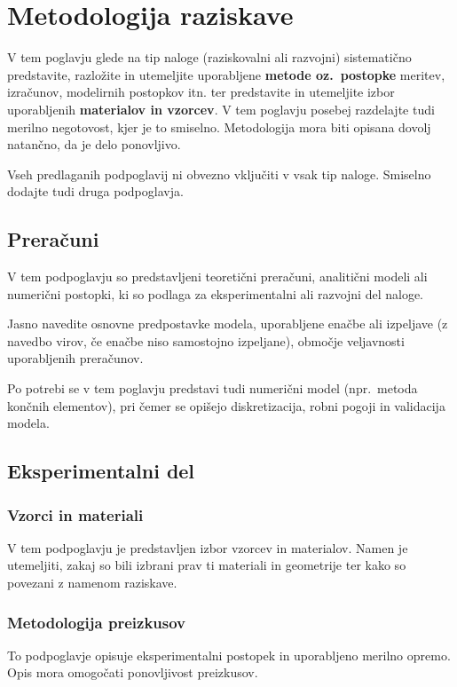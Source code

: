 \chapter{Metodologija raziskave}\label{cha:metodologija}
V tem poglavju glede na tip naloge (raziskovalni ali razvojni) sistematično predstavite, razložite in utemeljite uporabljene \textbf{metode oz.~postopke} meritev, izračunov, modelirnih postopkov itn. ter predstavite in utemeljite izbor uporabljenih \textbf{materialov in vzorcev}. V tem poglavju posebej razdelajte tudi merilno negotovost, kjer je to smiselno. Metodologija mora biti opisana dovolj natančno, da je delo ponovljivo.

Vseh predlaganih podpoglavij ni obvezno vključiti v vsak tip naloge. Smiselno dodajte tudi druga podpoglavja.

\section{Preračuni}\label{sec:preracuni}
V tem podpoglavju so predstavljeni teoretični preračuni, analitični modeli ali numerični postopki, ki so podlaga za eksperimentalni ali razvojni del naloge.

Jasno navedite osnovne predpostavke modela, uporabljene enačbe ali izpeljave (z navedbo virov, če enačbe niso samostojno izpeljane), območje veljavnosti uporabljenih preračunov.

Po potrebi se v tem poglavju predstavi tudi numerični model (npr.~metoda končnih elementov), pri čemer se opišejo diskretizacija, robni pogoji in validacija modela.

\section{Eksperimentalni del}\label{sec:eksperimentalni_del}

\subsection{Vzorci in materiali}\label{sec:vzorci_materiali}
V tem podpoglavju je predstavljen izbor vzorcev in materialov. Namen je utemeljiti, zakaj so bili izbrani prav ti materiali in geometrije ter kako so povezani z namenom raziskave.

\subsection{Metodologija preizkusov}\label{sec:metodologija_preizkusov}
To podpoglavje opisuje eksperimentalni postopek in uporabljeno merilno opremo. Opis mora omogočati ponovljivost preizkusov.
